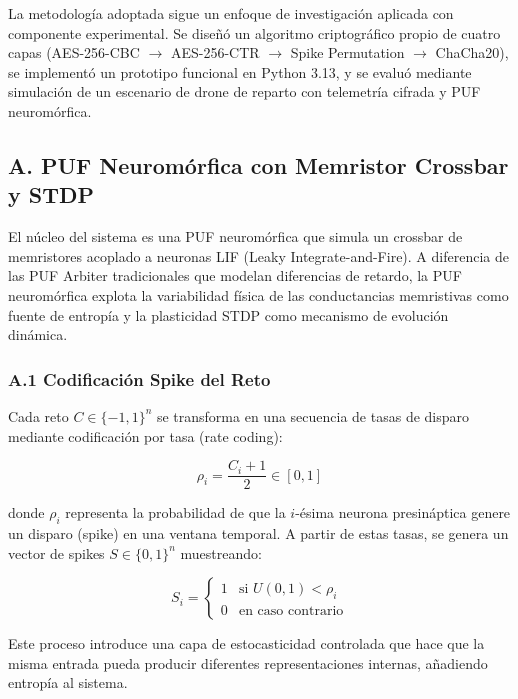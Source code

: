 La metodología adoptada sigue un enfoque de investigación aplicada con componente experimental. Se diseñó un algoritmo criptográfico propio de cuatro capas (AES-256-CBC $\to$ AES-256-CTR $\to$ Spike Permutation $\to$ ChaCha20), se implementó un prototipo funcional en Python 3.13, y se evaluó mediante simulación de un escenario de drone de reparto con telemetría cifrada y PUF neuromórfica.

\subsection*{A. PUF Neuromórfica con Memristor Crossbar y STDP}

El núcleo del sistema es una PUF neuromórfica que simula un crossbar de memristores acoplado a neuronas LIF (Leaky Integrate-and-Fire). A diferencia de las PUF Arbiter tradicionales que modelan diferencias de retardo, la PUF neuromórfica explota la variabilidad física de las conductancias memristivas como fuente de entropía y la plasticidad STDP como mecanismo de evolución dinámica.

\subsubsection*{A.1 Codificación Spike del Reto}

Cada reto $C \in \{-1,1\}^n$ se transforma en una secuencia de tasas de disparo mediante codificación por tasa (rate coding):

\begin{equation}
    \rho_i = \frac{C_i + 1}{2} \in [0, 1]
    \label{eq:rate}
\end{equation}

donde $\rho_i$ representa la probabilidad de que la $i$-ésima neurona presináptica genere un disparo (spike) en una ventana temporal. A partir de estas tasas, se genera un vector de spikes $S \in \{0,1\}^n$ muestreando:

\begin{equation}
    S_i = \begin{cases} 1 & \text{si } U(0,1) < \rho_i \\ 0 & \text{en caso contrario} \end{cases}
    \label{eq:spike_gen}
\end{equation}

Este proceso introduce una capa de estocasticidad controlada que hace que la misma entrada pueda producir diferentes representaciones internas, añadiendo entropía al sistema.

